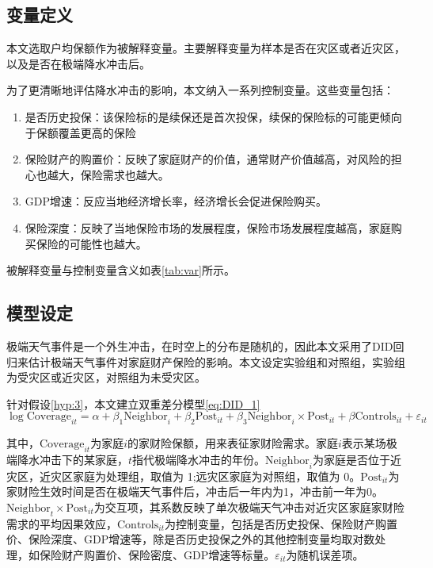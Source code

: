 \subsection{变量定义}
本文选取户均保额作为被解释变量。主要解释变量为样本是否在灾区或者近灾区，以及是否在极端降水冲击后。

为了更清晰地评估降水冲击的影响，本文纳入一系列控制变量。这些变量包括：

\begin{enumerate}
    \item 是否历史投保：该保险标的是续保还是首次投保，续保的保险标的可能更倾向于保额覆盖更高的保险
    \item 保险财产的购置价：反映了家庭财产的价值，通常财产价值越高，对风险的担心也越大，保险需求也越大。
    \item GDP增速：反应当地经济增长率，经济增长会促进保险购买。
    \item 保险深度：反映了当地保险市场的发展程度，保险市场发展程度越高，家庭购买保险的可能性也越大。
\end{enumerate}

被解释变量与控制变量含义如表\ref{tab:var}所示。


\subsection{模型设定}
极端天气事件是一个外生冲击，在时空上的分布是随机的，因此本文采用了DID回归来估计极端天气事件对家庭财产保险的影响。本文设定实验组和对照组，实验组为受灾区或近灾区，对照组为未受灾区。

针对假设\ref{hyp:3}，本文建立双重差分模型\ref{eq:DID_1}
\begin{equation}
    \log\text{Coverage}_{it}=\alpha+\beta_1\text{Neighbor}_{i}+\beta_2\text{Post}_{it}+\beta_3\text{Neighbor}_{i}\times\text{Post}_{it}+\beta\text{Controls}_{it}+\varepsilon_{it}
    \label{eq:DID_2}
\end{equation}

其中，$\text{Coverage}_{it}$为家庭$i$的家财险保额，用来表征家财险需求。家庭$i$表示某场极端降水冲击下的某家庭，$t$指代极端降水冲击的年份。$\text{Neighbor}_{i}$为家庭是否位于近灾区，近灾区家庭为处理组，取值为 1;远灾区家庭为对照组，取值为 0。$\text{Post}_{it}$为家财险生效时间是否在极端天气事件后，冲击后一年内为1，冲击前一年为0。$\text{Neighbor}_{t}\times\text{Post}_{it}$为交互项，其系数反映了单次极端天气冲击对近灾区家庭家财险需求的平均因果效应，$\text{Controls}_{it}$为控制变量，包括是否历史投保、保险财产购置价、保险深度、GDP增速等，除是否历史投保之外的其他控制变量均取对数处理，如保险财产购置价、保险密度、GDP增速等标量。$\varepsilon_{it}$为随机误差项。

